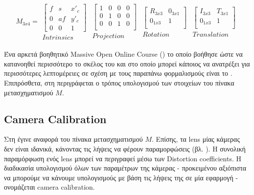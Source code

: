 \begin{gather}
	M_{3x4} = 
    \begin{matrix}
        \begin{bmatrix} 
            f & s & x'_c \\ 
            0 & af & y'_c \\
            0  & 0 & 1
        \end{bmatrix}\\
        Intrinsics
    \end{matrix}
    \begin{matrix}
        \begin{bmatrix} 
            1 & 0 & 0 & 0 \\ 
            0 & 1 & 0 & 0 \\ 
            0 & 0 & 1 & 0 \\ 
        \end{bmatrix}\\
        Projection
    \end{matrix}
    \begin{matrix}
        \begin{bmatrix} 
            R_{3x3} & 0_{3x1} \\ 
            0_{1x3} & 1 \\  
        \end{bmatrix}\\
        Rotation
    \end{matrix}
    \begin{matrix}
        \begin{bmatrix} 
            I_{3x3} & T_{3x1} \\ 
            0_{1x3} & 1 \\  
        \end{bmatrix}\\
        Translation
    \end{matrix} \label{eq:world-to-image-matrix}
\end{gather}

Ένα αρκετά βοηθητικό Massive Open Online Course () το οποίο βοήθησε ώστε να κατανοηθεί περισσότερο το σκέλος του  και στο οποίο μπορεί κάποιος να ανατρέξει για περισσότερες λεπτομέρειες σε σχέση με τους παραπάνω φορμαλισμούς είναι το \cite{introduction-to-computer-vision}. Επιπρόσθετα, στη  περιγράφεται ο τρόπος υπολογισμού των στοιχείων του πίνακα μετασχηματισμού $M$.

\subsection{Camera Calibration} \label{sec:camera-calibration}
Στη  έγινε αναφορά του πίνακα μετασχηματισμού $M$. Επίσης, τα lens μίας κάμερας δεν είναι ιδανικά, κάνοντας τις λήψεις να φέρουν παραμορφώσεις (βλ. ). Η συνολική παραμόρφωση ενός lens μπορεί να περιγραφεί μέσω των Distortion coefficients. Η διαδικασία υπολογισμού όλων των παραμέτρων της κάμερας - προκειμένου αξιόπιστα να μπορούμε να κάνουμε υπολογισμούς με βάση τις λήψεις της σε μία  εφαρμογή - ονομάζεται camera calibration. 

